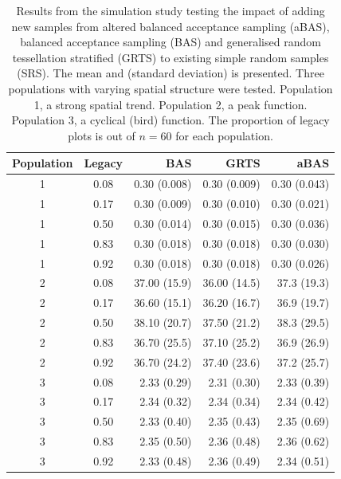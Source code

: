 \documentclass[titlepage]{article}
\begin{document}
\begin{table}[H]
	\caption{Results from the simulation study testing the impact of adding new samples from altered balanced acceptance sampling (aBAS), balanced acceptance sampling (BAS) and generalised random tessellation stratified (GRTS) to existing simple random samples (SRS). The mean and (standard deviation) is presented. Three populations with varying spatial structure were tested. Population 1, a strong spatial trend. Population 2, a peak function. Population 3, a cyclical (bird) function. The proportion of legacy plots is out of $n = 60$ for each population.}
	\label{simsrs}
	\begin{tabular}{ccrrr}
		\hline
		Population & Legacy & BAS & GRTS & aBAS \\ 
		\hline
		1 & 0.08 & 0.30 (0.008) & 0.30 (0.009) & 0.30 (0.043) \\ 
		1 & 0.17 & 0.30 (0.009) & 0.30 (0.010) & 0.30 (0.021) \\ 
		1 & 0.50 & 0.30 (0.014) & 0.30 (0.015) & 0.30 (0.036) \\ 
		1 & 0.83 & 0.30 (0.018) & 0.30 (0.018) & 0.30 (0.030) \\ 
		1 & 0.92 & 0.30 (0.018) & 0.30 (0.018) & 0.30 (0.026) \\ 
		2 & 0.08 & 37.00 (15.9) & 36.00 (14.5) & 37.3 (19.3) \\ 
		2 & 0.17 & 36.60 (15.1) & 36.20 (16.7) & 36.9 (19.7) \\ 
		2 & 0.50 & 38.10 (20.7) & 37.50 (21.2) & 38.3 (29.5) \\ 
		2 & 0.83 & 36.70 (25.5) & 37.10 (25.2) & 36.9 (26.9) \\ 
		2 & 0.92 & 36.70 (24.2) & 37.40 (23.6) & 37.2 (25.7) \\ 
		3 & 0.08 & 2.33 (0.29) & 2.31 (0.30) & 2.33 (0.39) \\ 
		3 & 0.17 & 2.34 (0.32) & 2.34 (0.34) & 2.34 (0.42) \\ 
		3 & 0.50 & 2.33 (0.40) & 2.35 (0.43) & 2.35 (0.69) \\ 
		3 & 0.83 & 2.35 (0.50) & 2.36 (0.48) & 2.36 (0.62) \\ 
		3 & 0.92 & 2.33 (0.48) & 2.36 (0.49) & 2.34 (0.51) \\ 
		\hline
	\end{tabular}

\end{table}

\newpage
\end{document}
